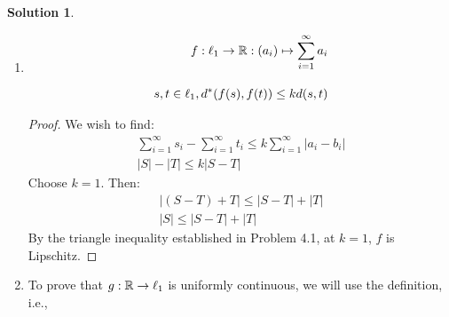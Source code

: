 \documentclass[12pt]{article}
\theoremstyle{definition} %
\newtheorem{solution}{Solution}
\theoremstyle{plain} %
\begin{document}
\begin{solution}
\begin{enumerate}
\begin{enumerate}
\begin{proof}
                    \begin{align}
                        \sum_{i=1}^{\infty} \left\vert a_i -b_{i} \right\vert +\sum_{i=1}^{\infty} \left\vert b_{i}-c_{i}  \right\vert \geq \sum_{i=1}^{\infty} \left\vert a_i -c_{i} \right\vert \\[10pt] 
                        \sum_{i=1}^{\infty} a_i = A, \sum_{i=1}^{\infty} b_i = B, \sum_{i=1}^{\infty} c_i = C \label{hw-5}\\[10pt] 
                        \left\vert A-B \right\vert +\left\vert B-C \right\vert \geq \left\vert A -C \right\vert \\[10pt] 
                        \left\vert A-B \right\vert +\left\vert B-C \right\vert \geq \left\vert (A-B)+(B-C) \right\vert \label{ti}
                    \end{align} 
    Where \autoref{hw-5} is proven in Homework 5 Problem 3.1, and \autoref{ti} is proven by the triangle inequality.
                \end{proof}
            \end{enumerate}
            \item \begin{align}
                f: \ell_1 \to \mathbb{\MakeUppercase{r}} : (a_{i}) \mapsto \sum_{i=1}^{\infty} a_{i}\\[10pt] 
                s,t \in \ell_1, d^{*}(f(s), f(t))\leq kd(s,t)
            \end{align}
            \begin{proof}
             We wish to find:
            \begin{align}
                \sum_{i=1}^{\infty} s_{i} - \sum_{i=1}^{\infty} t_{i} \leq k \sum_{i=1}^{\infty} \left\vert a_{i}-b_{i} \right\vert \\[10pt] 
                \left\vert S \right\vert -\left\vert T \right\vert \leq k\left\vert S-T \right\vert 
            \end{align} 
            Choose $k=1$. Then:
            \begin{align}
                \left\vert \left( S-T \right)+T  \right\vert \leq \left\vert S-T \right\vert +\left\vert T \right\vert \\[10pt] 
                \left\vert S \right\vert \leq \left\vert S-T \right\vert +\left\vert T \right\vert 
            \end{align}
            By the triangle inequality established in Problem 4.1, at $k = 1$, $f$ is Lipschitz. 
            \end{proof}
            \item To prove that $g: \mathbb{\MakeUppercase{r}} \to \ell_1$ is uniformly continuous, we will use the definition, i.e., 

\end{enumerate}
\end{solution}
\end{document}
